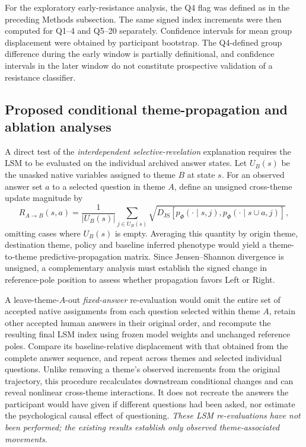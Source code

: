 \documentclass[11pt]{article}
\newcommand{\Ph}{\Phi}
\newcommand{\JS}{D_{\mathrm{JS}}}
\begin{document}
For the exploratory early-resistance analysis, the Q4 flag was defined as in the preceding Methods subsection. The same signed index increments were then computed for Q1--4 and Q5--20 separately. Confidence intervals for mean group displacement were obtained by participant bootstrap. The Q4-defined group difference during the early window is partially definitional, and confidence intervals in the later window do not constitute prospective validation of a resistance classifier.

\subsection*{Proposed conditional theme-propagation and ablation analyses}
A direct test of the \emph{interdependent selective-revelation} explanation requires the LSM to be evaluated on the individual archived answer states. Let $U_B(s)$ be the unasked native variables assigned to theme $B$ at state $s$. For an observed answer set $a$ to a selected question in theme $A$, define an unsigned cross-theme update magnitude by
\begin{equation}
R_{A\to B}(s,a)=\frac{1}{|U_B(s)|}
\sum_{j\in U_B(s)}
\sqrt{\JS\!\left[p_\Ph(\cdot\mid s,j),p_\Ph(\cdot\mid s\cup a,j)\right]},
\end{equation}
omitting cases where $U_B(s)$ is empty. Averaging this quantity by origin theme, destination theme, policy and baseline inferred phenotype would yield a theme-to-theme predictive-propagation matrix. Since Jensen--Shannon divergence is unsigned, a complementary analysis must establish the signed change in reference-pole position to assess whether propagation favors Left or Right.

A leave-theme-$A$-out \emph{fixed-answer} re-evaluation would omit the entire set of accepted native assignments from each question selected within theme $A$, retain other accepted human answers in their original order, and recompute the resulting final LSM index using frozen model weights and unchanged reference poles. Compare its baseline-relative displacement with that obtained from the complete answer sequence, and repeat across themes and selected individual questions. Unlike removing a theme's observed increments from the original trajectory, this procedure recalculates downstream conditional changes and can reveal nonlinear cross-theme interactions. It does not recreate the answers the participant would have given if different questions had been asked, nor estimate the psychological causal effect of questioning. \emph{These LSM re-evaluations have not been performed; the existing results establish only observed theme-associated movements.}
\end{document}
